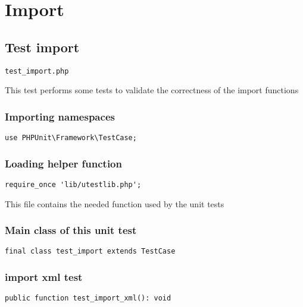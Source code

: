 \documentclass[a4paper]{article}
\begin{document}
\hypertarget{toc252}{}
\section{Import}

\hypertarget{toc253}{}
\subsection{Test import}

\begin{lstlisting}
test_import.php
\end{lstlisting}

This test performs some tests to validate the correctness
of the import functions

\hypertarget{toc254}{}
\subsubsection{Importing namespaces}

\begin{lstlisting}
use PHPUnit\Framework\TestCase;
\end{lstlisting}

\hypertarget{toc255}{}
\subsubsection{Loading helper function}

\begin{lstlisting}
require_once 'lib/utestlib.php';
\end{lstlisting}

This file contains the needed function used by the unit tests

\hypertarget{toc256}{}
\subsubsection{Main class of this unit test}

\begin{lstlisting}
final class test_import extends TestCase
\end{lstlisting}

\hypertarget{toc257}{}
\subsubsection{import xml test}

\begin{lstlisting}
public function test_import_xml(): void
\end{lstlisting}
\end{document}
